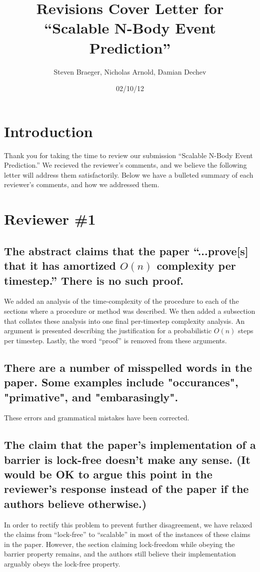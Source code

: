 \documentclass[letterpaper,10pt]{article}
\author{Steven Braeger, Nicholas Arnold, Damian Dechev}
\title{Revisions Cover Letter for ``Scalable N-Body Event Prediction''}
\date{02/10/12}
\begin{document}
\maketitle

\section{Introduction}

Thank you for taking the time to review our submission ``Scalable N-Body Event Prediction.''  We recieved the reviewer's comments, and we believe the 
following letter will address them satisfactorily.  Below we have a bulleted summary of each reviewer's comments, and how we addressed them.

\section{Reviewer \#1}

\subsection{The abstract claims that the paper ``...prove[s] that it has amortized $O(n)$ complexity per timestep.'' There is no such proof.}
We added an analysis of the time-complexity of the procedure to each of the sections where a procedure or method was described.  We then 
added a subsection that collates these analysis into one final per-timestep complexity analysis.  An argument is presented describing the justification for a 
probabilistic $O(n)$ steps per timestep.  Lastly, the word ``proof'' is removed from these arguments.
\subsection{There are a number of misspelled words in the paper. Some examples include "occurances", "primative", and "embarasingly".}
These errors and grammatical mistakes have been corrected.

\subsection{The claim that the paper's implementation of a barrier is lock-free doesn't make any sense. (It would be OK to argue this point in the reviewer's response instead of the paper if the authors believe otherwise.) }
In order to rectify this problem to prevent further disagreement, we have relaxed the claims from ``lock-free'' to ``scalable'' in most of the 
instances of these claims in the paper.  However, the section claiming lock-freedom while obeying the barrier property remains, and the authors still believe their implementation arguably obeys the lock-free property.
\end{document}
